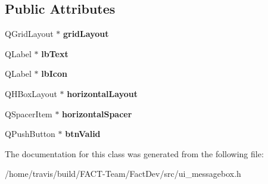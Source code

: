 \subsection*{Public Attributes}
\begin{DoxyCompactItemize}
\item 
\hypertarget{classUi__MessageBox_aaa91496aefb943742400851bdf8af287}{Q\-Grid\-Layout $\ast$ {\bfseries grid\-Layout}}\label{classUi__MessageBox_aaa91496aefb943742400851bdf8af287}

\item 
\hypertarget{classUi__MessageBox_a011b499497981805706a67d08bcf092f}{Q\-Label $\ast$ {\bfseries lb\-Text}}\label{classUi__MessageBox_a011b499497981805706a67d08bcf092f}

\item 
\hypertarget{classUi__MessageBox_ac70d6fe73931f16ef6f7f281820db2cb}{Q\-Label $\ast$ {\bfseries lb\-Icon}}\label{classUi__MessageBox_ac70d6fe73931f16ef6f7f281820db2cb}

\item 
\hypertarget{classUi__MessageBox_a6ff6d06ad1ee4186e45958cc2920af36}{Q\-H\-Box\-Layout $\ast$ {\bfseries horizontal\-Layout}}\label{classUi__MessageBox_a6ff6d06ad1ee4186e45958cc2920af36}

\item 
\hypertarget{classUi__MessageBox_a2a9080061dda973cf9f1a0790d5960b9}{Q\-Spacer\-Item $\ast$ {\bfseries horizontal\-Spacer}}\label{classUi__MessageBox_a2a9080061dda973cf9f1a0790d5960b9}

\item 
\hypertarget{classUi__MessageBox_af49614e50f1a6f249f730beb4500070a}{Q\-Push\-Button $\ast$ {\bfseries btn\-Valid}}\label{classUi__MessageBox_af49614e50f1a6f249f730beb4500070a}

\end{DoxyCompactItemize}


The documentation for this class was generated from the following file\-:\begin{DoxyCompactItemize}
\item 
/home/travis/build/\-F\-A\-C\-T-\/\-Team/\-Fact\-Dev/src/ui\-\_\-messagebox.\-h\end{DoxyCompactItemize}

